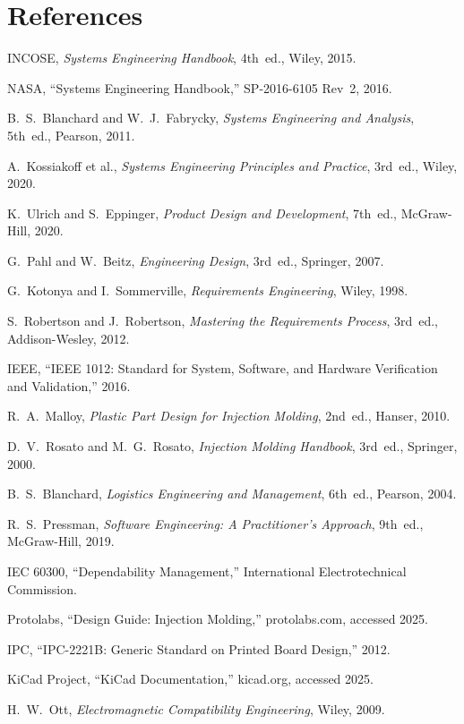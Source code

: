 \chapter*{References}

\begin{enumerate}[label={[\arabic*]},leftmargin=2em]
\item INCOSE, \emph{Systems Engineering Handbook}, 4th~ed., Wiley, 2015.
\item NASA, ``Systems Engineering Handbook,'' SP-2016-6105 Rev~2, 2016.
\item B.~S.~Blanchard and W.~J.~Fabrycky, \emph{Systems Engineering and Analysis}, 5th~ed., Pearson, 2011.
\item A.~Kossiakoff et al., \emph{Systems Engineering Principles and Practice}, 3rd~ed., Wiley, 2020.
\item K.~Ulrich and S.~Eppinger, \emph{Product Design and Development}, 7th~ed., McGraw-Hill, 2020.
\item G.~Pahl and W.~Beitz, \emph{Engineering Design}, 3rd~ed., Springer, 2007.
\item G.~Kotonya and I.~Sommerville, \emph{Requirements Engineering}, Wiley, 1998.
\item S.~Robertson and J.~Robertson, \emph{Mastering the Requirements Process}, 3rd~ed., Addison-Wesley, 2012.
\item IEEE, ``IEEE 1012: Standard for System, Software, and Hardware Verification and Validation,'' 2016.
\item R.~A.~Malloy, \emph{Plastic Part Design for Injection Molding}, 2nd~ed., Hanser, 2010.
\item D.~V.~Rosato and M.~G.~Rosato, \emph{Injection Molding Handbook}, 3rd~ed., Springer, 2000.
\item B.~S.~Blanchard, \emph{Logistics Engineering and Management}, 6th~ed., Pearson, 2004.
\item R.~S.~Pressman, \emph{Software Engineering: A Practitioner's Approach}, 9th~ed., McGraw-Hill, 2019.
\item IEC 60300, ``Dependability Management,'' International Electrotechnical Commission.
\item Protolabs, ``Design Guide: Injection Molding,'' protolabs.com, accessed 2025.
\item IPC, ``IPC-2221B: Generic Standard on Printed Board Design,'' 2012.
\item KiCad Project, ``KiCad Documentation,'' kicad.org, accessed 2025.
\item H.~W.~Ott, \emph{Electromagnetic Compatibility Engineering}, Wiley, 2009.

\end{enumerate}
